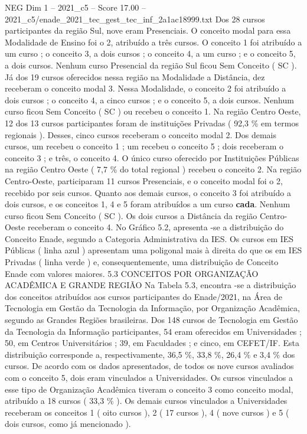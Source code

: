 \begin{textsample}{NEG Dim 1 – 2021\_c5 – Score 17.00 – 2021\_c5/enade\_2021\_tec\_gest\_tec\_inf\_2a1ac18999.txt}
Dos 28 cursos participantes da região Sul, nove eram Presenciais.
O conceito modal para essa Modalidade de Ensino foi o 2, atribuído a três cursos.
O conceito 1 foi atribuído a um curso ; o conceito 3, a dois cursos ; o conceito 4, a um curso ; e o conceito 5, a dois cursos.
Nenhum curso Presencial da região Sul ficou Sem Conceito ( SC ).
Já dos 19 cursos oferecidos nessa região na Modalidade a Distância, dez receberam o conceito modal 3.
Nessa Modalidade, o conceito 2 foi atribuído a dois cursos ; o conceito 4, a cinco cursos ; e o conceito 5, a dois cursos.
Nenhum curso ficou Sem Conceito ( SC ) ou recebeu o conceito 1.
Na região Centro Oeste, 12 dos 13 cursos participantes foram de instituições Privadas ( 92,3 \% em termos regionais ).
Desses, cinco cursos receberam o conceito modal 2.
Dos demais cursos, um recebeu o conceito 1 ; um recebeu o conceito 5 ; dois receberam o conceito 3 ; e três, o conceito 4.
O único curso oferecido por Instituições Públicas na região Centro Oeste ( 7,7 \% do total regional ) recebeu o conceito 2.
Na região Centro-Oeste, participaram 11 cursos Presenciais, e o conceito modal foi o 2, recebido por seis cursos.
Quanto aos demais cursos, o conceito 3 foi atribuído a dois cursos, e os conceitos 1, 4 e 5 foram atribuídos a um curso \textbf{cada}.
Nenhum curso ficou Sem Conceito ( SC ).
Os dois cursos a Distância da região Centro-Oeste receberam o conceito 4.
No Gráfico 5.2, apresenta -se a distribuição do Conceito Enade, segundo a Categoria Administrativa da IES.
Os cursos em IES Públicas ( linha azul ) apresentam uma poligonal mais à direita do que os em IES Privadas ( linha verde ) e, consequentemente, uma distribuição de Conceito Enade com valores maiores. 5.3 CONCEITOS POR ORGANIZAÇÃO ACADÊMICA E GRANDE REGIÃO Na Tabela 5.3, encontra -se a distribuição dos conceitos atribuídos aos cursos participantes do Enade/2021, na Área de Tecnologia em Gestão da Tecnologia da Informação, por Organização Acadêmica, segundo as Grandes Regiões brasileiras.
Dos 148 cursos de Tecnologia em Gestão da Tecnologia da Informação participantes, 54 eram oferecidos em Universidades ; 50, em Centros Universitários ; 39, em Faculdades ; e cinco, em CEFET/IF.
Esta distribuição corresponde a, respectivamente, 36,5 \%, 33,8 \%, 26,4 \% e 3,4 \% dos cursos.
De acordo com os dados apresentados, de todos os nove cursos avaliados com o conceito 5, dois eram vinculados a Universidades.
Os cursos vinculados a esse tipo de Organização Acadêmica tiveram o conceito 3 como conceito modal, atribuído a 18 cursos ( 33,3 \% ).
Os demais cursos vinculados a Universidades receberam os conceitos 1 ( oito cursos ), 2 ( 17 cursos ), 4 ( nove cursos ) e 5 ( dois cursos, como já mencionado ).

\end{textsample}
